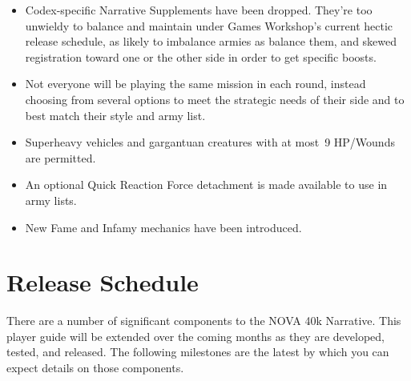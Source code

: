 \begin{itemize}


\item Codex-specific Narrative Supplements have been dropped.  They're
  too unwieldy to balance and maintain under Games Workshop's current
  hectic release schedule, as likely to imbalance armies as balance
  them, and skewed registration toward one or the other side in order
  to get specific boosts.


\item Not everyone will be playing the same mission in each round,
  instead choosing from several options to meet the strategic needs of
  their side and to best match their style and army list.

\item Superheavy vehicles and gargantuan creatures with at most~9
  HP/Wounds are permitted.

\item An optional Quick Reaction Force detachment is made available to
  use in army lists.

\item New Fame and Infamy mechanics have been introduced.
\end{itemize}

\section{Release Schedule}

There are a number of significant components to the NOVA 40k
Narrative.  This player guide will be extended over the coming months
as they are developed, tested, and released.  The following milestones
are the latest by which you can expect details on those components.

